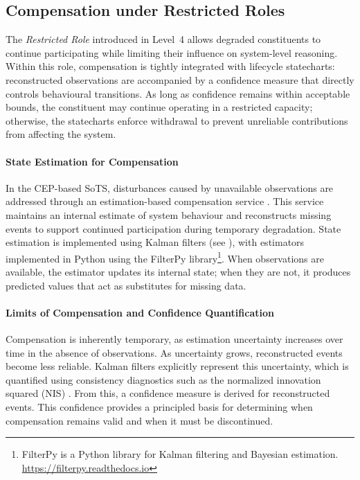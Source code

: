 \subsection{Compensation under Restricted Roles}\label{sec:demo-compensation}
The \textit{Restricted Role} introduced in Level~4 allows degraded constituents to continue participating while limiting their influence on system-level reasoning. Within this role, compensation is tightly integrated with lifecycle statecharts: reconstructed observations are accompanied by a confidence measure that directly controls behavioural transitions. As long as confidence remains within acceptable bounds, the constituent may continue operating in a restricted capacity; otherwise, the statecharts enforce withdrawal to prevent unreliable contributions from affecting the system.

\paragraph{State Estimation for Compensation}
In the CEP-based SoTS, disturbances caused by unavailable observations are addressed through an estimation-based compensation service \cite{hanmer2013patterns}. This service maintains an internal estimate of system behaviour and reconstructs missing events to support continued participation during temporary degradation. State estimation is implemented using Kalman filters \cite{kalman1960filtering} (see ), with estimators implemented in Python using the FilterPy library\footnote{FilterPy is a Python library for Kalman filtering and Bayesian estimation. \url{https://filterpy.readthedocs.io}}. When observations are available, the estimator updates its internal state; when they are not, it produces predicted values that act as substitutes for missing data.
\paragraph{Limits of Compensation and Confidence Quantification}
Compensation is inherently temporary, as estimation uncertainty increases over time in the absence of observations. As uncertainty grows, reconstructed events become less reliable. Kalman filters explicitly represent this uncertainty, which is quantified using consistency diagnostics such as the normalized innovation squared (NIS) \cite{bar2001estimation,simon2006optimal}. From this, a confidence measure is derived for reconstructed events. This confidence provides a principled basis for determining when compensation remains valid and when it must be discontinued.




